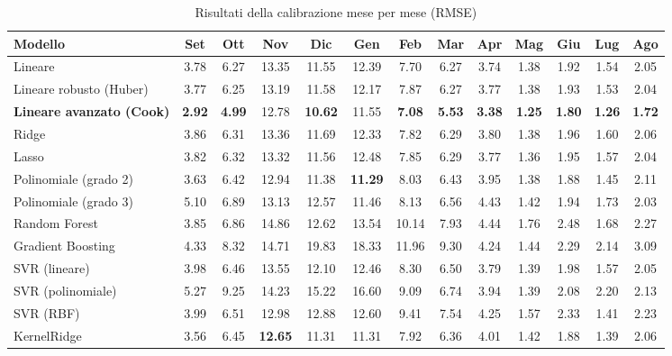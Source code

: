 \begin{table}[H]
    \tiny
    \centering
    \setlength{\tabcolsep}{4pt}
    \def\arraystretch{1.5}
    \begin{tabular}{|l|c|c|c|c|c|c|c|c|c|c|c|c|}
    \hline
        \textbf{Modello} & \textbf{Set} & \textbf{Ott} & \textbf{Nov} & \textbf{Dic} & \textbf{Gen} & \textbf{Feb} & \textbf{Mar} & \textbf{Apr} & \textbf{Mag} & \textbf{Giu} & \textbf{Lug} & \textbf{Ago} \\ \hline
        Lineare & 3.78 & 6.27 & 13.35 & 11.55 & 12.39 & 7.70 & 6.27 & 3.74 & 1.38 & 1.92 & 1.54 & 2.05 \\ \hline
        Lineare robusto (Huber) & 3.77 & 6.25 & 13.19 & 11.58 & 12.17 & 7.87 & 6.27 & 3.77 & 1.38 & 1.93 & 1.53 & 2.04 \\ \hline
        \textbf{Lineare avanzato (Cook)} & \textbf{2.92} & \textbf{4.99} & 12.78 & \textbf{10.62} & 11.55 & \textbf{7.08} & \textbf{5.53} & \textbf{3.38} & \textbf{1.25} & \textbf{1.80} & \textbf{1.26} & \textbf{1.72} \\ \hline
        Ridge & 3.86 & 6.31 & 13.36 & 11.69 & 12.33 & 7.82 & 6.29 & 3.80 & 1.38 & 1.96 & 1.60 & 2.06 \\ \hline
        Lasso & 3.82 & 6.32 & 13.32 & 11.56 & 12.48 & 7.85 & 6.29 & 3.77 & 1.36 & 1.95 & 1.57 & 2.04 \\ \hline
        Polinomiale (grado 2) & 3.63 & 6.42 & 12.94 & 11.38 & \textbf{11.29} & 8.03 & 6.43 & 3.95 & 1.38 & 1.88 & 1.45 & 2.11 \\ \hline
        Polinomiale (grado 3) & 5.10 & 6.89 & 13.13 & 12.57 & 11.46 & 8.13 & 6.56 & 4.43 & 1.42 & 1.94 & 1.73 & 2.03 \\ \hline
        Random Forest & 3.85 & 6.86 & 14.86 & 12.62 & 13.54 & 10.14 & 7.93 & 4.44 & 1.76 & 2.48 & 1.68 & 2.27 \\ \hline
        Gradient Boosting & 4.33 & 8.32 & 14.71 & 19.83 & 18.33 & 11.96 & 9.30 & 4.24 & 1.44 & 2.29 & 2.14 & 3.09 \\ \hline
        SVR (lineare) & 3.98 & 6.46 & 13.55 & 12.10 & 12.46 & 8.30 & 6.50 & 3.79 & 1.39 & 1.98 & 1.57 & 2.05 \\ \hline
        SVR (polinomiale) & 5.27 & 9.25 & 14.23 & 15.22 & 16.60 & 9.09 & 6.74 & 3.94 & 1.39 & 2.08 & 2.20 & 2.13 \\ \hline
        SVR (RBF) & 3.99 & 6.51 & 12.98 & 12.88 & 12.60 & 9.41 & 7.54 & 4.25 & 1.57 & 2.33 & 1.41 & 2.23 \\ \hline
        KernelRidge & 3.56 & 6.45 & \textbf{12.65} & 11.31 & 11.31 & 7.92 & 6.36 & 4.01 & 1.42 & 1.88 & 1.39 & 2.06 \\ \hline
    \end{tabular}
    \caption{Risultati della calibrazione  mese per mese (RMSE)}
    \label{fig:risultati-pm2.5-rmse-mese}
\end{table}

